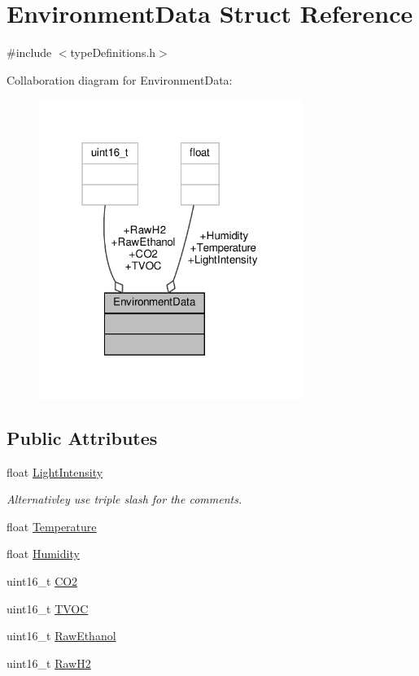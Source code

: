 \hypertarget{structEnvironmentData}{}\section{Environment\+Data Struct Reference}
\label{structEnvironmentData}


{\ttfamily \#include $<$type\+Definitions.\+h$>$}



Collaboration diagram for Environment\+Data\+:\nopagebreak
\begin{figure}[H]
\begin{center}
\leavevmode
\includegraphics[width=243pt]{structEnvironmentData__coll__graph}
\end{center}
\end{figure}
\subsection*{Public Attributes}
\begin{DoxyCompactItemize}
\item 
float \hyperlink{structEnvironmentData_a2013551c12a584a6680517d750b2116a}{Light\+Intensity}
\begin{DoxyCompactList}\small\item\em Alternativley use triple slash for the comments. \end{DoxyCompactList}\item 
float \hyperlink{structEnvironmentData_a5c8f919b34fe673a71726053d05cb775}{Temperature}
\item 
float \hyperlink{structEnvironmentData_a84e684c2dc15c5fb6bd87a03569cab05}{Humidity}
\item 
uint16\+\_\+t \hyperlink{structEnvironmentData_a5fe69eb57f3debefe5feba3a930ab851}{C\+O2}
\item 
uint16\+\_\+t \hyperlink{structEnvironmentData_aae4ac3338a76432de00582ba5af01a45}{T\+V\+OC}
\item 
uint16\+\_\+t \hyperlink{structEnvironmentData_a3c949734838b0bc862b8f7449b6df41c}{Raw\+Ethanol}
\item 
uint16\+\_\+t \hyperlink{structEnvironmentData_a89c96958697dd39ee2e41289debcd8a5}{Raw\+H2}
\end{DoxyCompactItemize}


